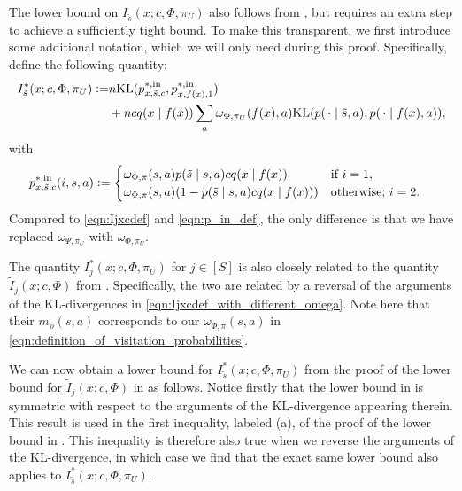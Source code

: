 \documentclass[11pt]{article}
\newcommand{\eqdef}{\vcentcolon=}
\newcommand{\KL}{\textnormal{KL}}
\theoremstyle{definition}
\theoremstyle{definition}
\begin{document}
The lower bound on $I_{\tilde{s}}(x;c,\Phi,\pi_U)$ also follows from \cite[Proposition 12]{Jedra:2022}, but requires an extra step to achieve a sufficiently tight bound.
To make this transparent, we first introduce some additional notation, which we will only need during this proof.
Specifically, define the following quantity:
\begin{equation}
	\label{eqn:Ijxcdef_with_different_omega}
	\begin{split}
		I^*_{\tilde{s}}(x;c,\Phi,\pi_U)
		\eqdef
		 &
		n\KL(p^{*,\mathrm{in}}_{x,\tilde{s},c},p^{*,\mathrm{in}}_{x,f(x),1})
		\\
		 &
		+
		ncq(x\mid f(x))\sum_{a}\omega_{\Phi,\pi_U}(f(x),a)\KL(p(\,\cdot \mid \tilde{s},a), p(\,\cdot \mid f(x),a)),
	\end{split}
\end{equation}
with
\begin{align}
	 &
	p^{*,\mathrm{in}}_{x,\tilde{s},c}(i,s,a)
	\eqdef
	\begin{cases}
		\omega_{\Phi,\pi}(s,a)p(\tilde{s}\mid s,a)cq(x\mid f(x))     & \textnormal{if } i = 1,         \\
		\omega_{\Phi,\pi}(s,a)(1-p(\tilde{s}\mid s,a)cq(x\mid f(x))) & \textnormal{otherwise; } i = 2. \\
	\end{cases}
\end{align}
Compared to \eqref{eqn:Ijxcdef} and \eqref{eqn:p_in_def}, the only difference is that we have replaced $\omega_{\Psi,\pi_U}$ with $\omega_{\Phi,\pi_U}$.

The quantity $I^*_{j}(x;c,\Phi,\pi_U)$ for $j\in[S]$ is also closely related to the quantity $\tilde{I}_j(x;c,\Phi)$ from \cite[Eqn. (37)-(39)]{Jedra:2022}.
Specifically, the two are related by a reversal of the arguments of the KL-divergences in \eqref{eqn:Ijxcdef_with_different_omega}.
Note here that their $m_{\rho}(s,a)$ corresponds to our $\omega_{\Phi,\pi}(s,a)$ in \eqref{eqn:definition_of_visitation_probabilities}.

We can now obtain a lower bound for $I^*_{\tilde{s}}(x;c,\Phi,\pi_U)$ from the proof of the lower bound for $\tilde{I}_j(x;c,\Phi)$ in \cite[Proposition 12]{Jedra:2022} as follows.
Notice firstly that the lower bound in \cite[Lemma 6]{Jedra:2022} is symmetric with respect to the arguments of the KL-divergence appearing therein.
This result is used in the first inequality, labeled (a), of the proof of the lower bound in \cite[Proposition 12]{Jedra:2022}.
This inequality is therefore also true when we reverse the arguments of the KL-divergence, in which case we find that the exact same lower bound also applies to $I^*_{\tilde{s}}(x;c,\Phi,\pi_U)$.
\end{document}
